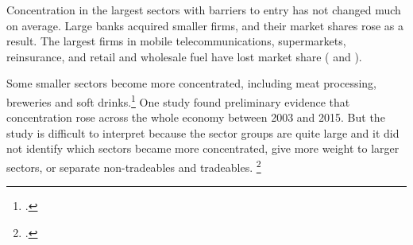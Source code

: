 


Concentration in the largest sectors with barriers to entry has not changed much on average. Large banks acquired smaller firms, and their market shares rose as a result. The largest firms in mobile telecommunications, supermarkets, reinsurance, and retail and wholesale fuel have lost market share ( and ).

Some smaller sectors become more concentrated, including meat processing, breweries and soft drinks.\footcite{Leigh-2016-Markets&Monopolies} One study found preliminary evidence that concentration rose across the whole economy between 2003 and 2015. But the study is difficult to interpret because the sector groups are quite large and it did not identify which sectors became more concentrated, give more weight to larger sectors, or separate non-tradeables and tradeables.%
  \footcite{Bakhtiari_2017}


